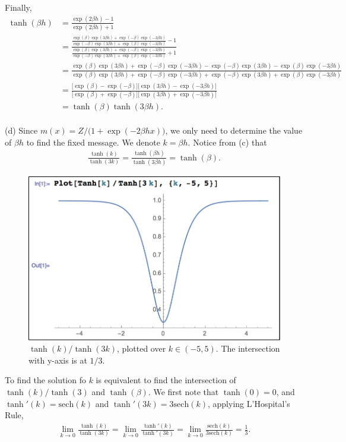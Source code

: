 \documentclass{article}
\newcommand{\qeds}{\hfill\qedsymbol}
\begin{document}
Finally,
\begin{align*}
	\tanh(\beta h) &= \frac{\exp(2\beta h) - 1}{ \exp(2\beta h) + 1} \\
	&= \frac{\frac{\exp(\beta)\exp(3\beta h) +
	        \exp(-\beta)\exp(-3\beta h)}
	       {\exp(-\beta)\exp(3\beta h) +
	        \exp(\beta)\exp(-3\beta h)} - 1}
	        {\frac{\exp(\beta)\exp(3\beta h) +
	        \exp(-\beta)\exp(-3\beta h)}
	       {\exp(-\beta)\exp(3\beta h) +
	        \exp(\beta)\exp(-3\beta h)} + 1} \\
    &= \frac{\exp(\beta)\exp(3\beta h) + \exp(-\beta)\exp(-3\beta h) -
             {\exp(-\beta)\exp(3\beta h) - \exp(\beta)\exp(-3\beta h)}}
            {\exp(\beta)\exp(3\beta h) + \exp(-\beta)\exp(-3\beta h) +
             {\exp(-\beta)\exp(3\beta h) + \exp(\beta)\exp(-3\beta h)}} \\
    &= \frac{\big[\exp(\beta) - \exp(-\beta)\big]
             \big[\exp(3\beta h) - \exp(-3\beta h)\big]}
            {\big[\exp(\beta) + \exp(-\beta)\big]
             \big[\exp(3\beta h) + \exp(-3\beta h)\big]}\\
    &= \tanh(\beta) \tanh(3\beta h).
\end{align*}\qeds
\\

\noindent
(d) Since $m(x) = Z/\big(1 + \exp(-2\beta h x)\big)$, we only need to determine the value
of $\beta h$ to find the fixed message. We denote $k = \beta h$. Notice from (c) that
\begin{align*}
	\frac{\tanh(k)}{\tanh(3k)} = \frac{\tanh(\beta h)}{\tanh(3\beta h)} = \tanh(\beta).
\end{align*}
%
\begin{figure}[h]
  \centering
  \includegraphics[width=0.4\columnwidth]{5d.pdf}
    \vspace{-0.1cm}
  \caption{$\tanh(k)/\tanh(3k)$, plotted over $k\in(-5,5)$. The intersection with y-axis is at $1/3$.}
  \label{f:5d}
\end{figure}
%

To find the solution fo $k$ is equivalent to find the intersection of $\tanh(k)/\tanh(3)$ and $\tanh(\beta)$.
We first note that $\tanh(0) = 0$, and $\tanh'(k) = \text{sech}(k)$ and $\tanh'(3k) = 3\text{sech}(k)$,
applying L'Hospital's Rule,
\begin{align*}
	\lim_{k\to 0} \frac{\tanh(k)}{\tanh(3k)} = \lim_{k\to 0} \frac{\tanh'(k)}{\tanh'(3k)} = \lim_{k\to 0} \frac{\text{sech}(k)}{3\text{sech}(k)} = \frac{1}{3}.
\end{align*}
\end{document}
